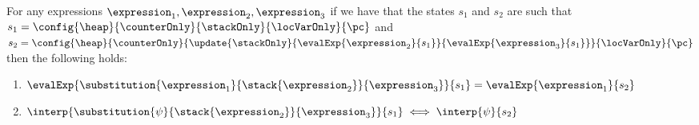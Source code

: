 %	  
%      


\begin{substStack}\label{substStack} 
For any expressions $ \expression_1, \expression_2, \expression_3 $ 
if we have that the states $s_1$ and $s_2$ are such that
 $s_1 =   \config{\heap}{\counterOnly}{ \stackOnly }{\locVarOnly}{\pc }$ and 
  $s_2 = \config{\heap}{\counterOnly}{ \update{\stackOnly}
                                                                 {\evalExp{\expression_2}{ s_1 } }
                                                                 { \evalExp{\expression_3}{ s_1  } } }{\locVarOnly}{\pc }$ then
 the following holds:
\begin{enumerate}
      \item  $     \evalExp{\substitution{\expression_1}{\stack{\expression_2}}{\expression_3}}{s_1 } = 
      \evalExp{\expression_1}{s_2 }$
      \item  $     \interp{\substitution{\psi}{\stack{\expression_2}}{\expression_3}}{s_1 } \iff
      \interp{\psi}{s_2 }$
\end{enumerate}
\end{substStack}

